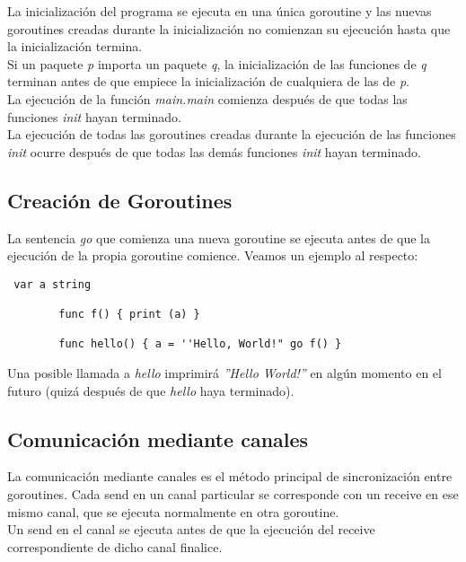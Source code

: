 	La inicialización del programa se ejecuta en una única goroutine y las
	nuevas goroutines creadas durante la inicialización no comienzan su
	ejecución hasta que la inicialización termina.\\
	
	Si un paquete \textit{p} importa un paquete \textit{q}, la inicialización de
	las funciones de \textit{q} terminan antes de que empiece la inicialización
	de cualquiera de las de \textit{p}.\\
	
	La ejecución de la función \textit{main.main} comienza después de que todas
	las funciones \textit{init} hayan terminado.\\
	
	La ejecución de todas las goroutines creadas durante la ejecución de las
	funciones \textit{init} ocurre después de que todas las demás funciones
	\textit{init} hayan terminado.\\ \clearpage \subsection{Creación de
	Goroutines}
	
	La sentencia \textit{go} que comienza una nueva goroutine se ejecuta antes
	de que la ejecución de la propia goroutine comience. Veamos un ejemplo al
	respecto:
	
	\begin{verbatim} var a string
	    
		func f() { print (a) }
	    
		func hello() { a = ''Hello, World!" go f() } \end{verbatim}
	
	Una posible llamada a \textit{hello} imprimirá \textit{''Hello World!''} en
	algún momento en el futuro (quizá después de que \textit{hello} haya
	terminado).
	
	\subsection{Comunicación mediante canales}
	
	La comunicación mediante canales es el método principal de sincronización
	entre goroutines. Cada send en un canal particular se corresponde con un
	receive en ese mismo canal, que se ejecuta normalmente en otra goroutine.\\
	
	Un send en el canal se ejecuta antes de que la ejecución del receive
	correspondiente de dicho canal finalice.\\
	
